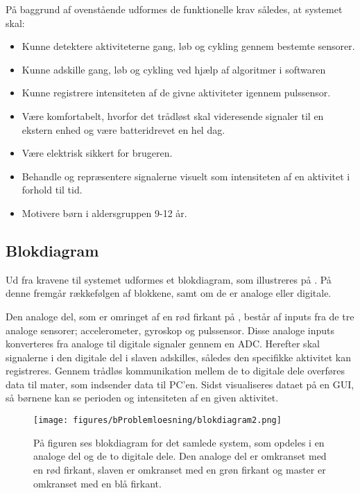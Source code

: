 På baggrund af ovenstående udformes de funktionelle krav således, at systemet skal: 
\begin{itemize}
	\item Kunne detektere aktiviteterne gang, løb og cykling gennem bestemte sensorer.
	\item Kunne adskille gang, løb og cykling ved hjælp af algoritmer i softwaren 
	\item Kunne registrere intensiteten af de givne aktiviteter igennem pulssensor.
	\item Være komfortabelt, hvorfor det trådløst skal videresende signaler til en ekstern enhed og være batteridrevet en hel dag.
	\item Være elektrisk sikkert for brugeren.
	\item Behandle og repræsentere signalerne visuelt som intensiteten af en aktivitet i forhold til tid.
	\item Motivere børn i aldersgruppen 9-12 år. 
\end{itemize}

\subsection{Blokdiagram}
Ud fra kravene til systemet udformes et blokdiagram, som illustreres på . På denne fremgår rækkefølgen af blokkene, samt om de er analoge eller digitale. 

Den analoge del, som er omringet af en rød firkant på , består af inputs fra de tre analoge sensorer; accelerometer, gyroskop og pulssensor. Disse analoge inputs konverteres fra analoge til digitale signaler gennem en ADC. Herefter skal signalerne i den digitale del i slaven adskilles, således den specifikke aktivitet kan registreres. Gennem trådløs kommunikation mellem de to digitale dele overføres data til mater, som indsender data til PC'en. Sidst visualiseres dataet på en GUI, så børnene kan se perioden og intensiteten af en given aktivitet.  

 \begin{figure}[H]
 	\centering
 	\texttt{[image: figures/bProblemloesning/blokdiagram2.png]}
 	\caption{På figuren ses blokdiagram for det samlede system, som opdeles i en analoge del og de to digitale dele. Den analoge del er omkranset med en rød firkant, slaven er omkranset med en grøn firkant og master er omkranset med en blå firkant.}
 	\label{fig:blokdiagram}
 \end{figure}
